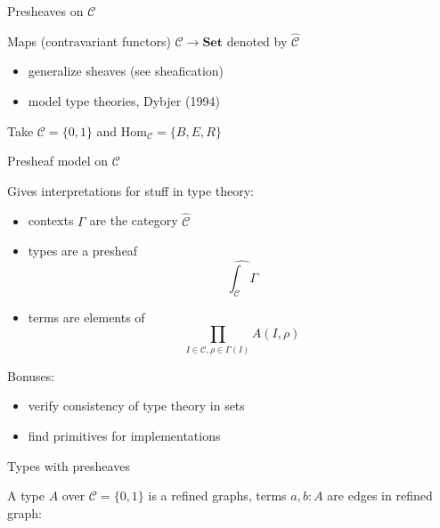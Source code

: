 \documentclass[english,draft]{beamer}
\begin{document}
\begin{frame}{Presheaves on $\mathcal{C}$}
 
 Maps (contravariant functors) $\mathcal{C} \rightarrow \mathbf{Set}$ denoted by $\hat{\mathcal{C}}$
 
 \begin{itemize}
 \item generalize sheaves (see sheafication)
 \item model type theories, Dybjer (1994)
 \end{itemize}
 
 \begin{example}    
 Take $\mathcal{C} = \{0,1\}$ and $\text{Hom}_{\mathcal{C}}= \{B,E,R\}$
 
     
 
 
 
\end{example} 

 
\end{frame}

\begin{frame}{Presheaf model on $\mathcal{C}$}
 
 Gives interpretations for stuff in type theory:
 \begin{itemize}
  \item contexts $\Gamma$ are the category $\widehat{\mathcal{C}}$
  \item types are a presheaf $$\widehat{\int_{\mathcal{C}} \Gamma}$$
  \item terms are elements of $$\prod _{I \in \mathcal{C}, \rho \in \Gamma (I)} A(I,\rho)$$
 \end{itemize}

 \pause
 
 Bonuses:
 
 \begin{itemize}
  \item verify consistency of type theory in sets
  \item find primitives for implementations
 \end{itemize}
 
\end{frame}

\begin{frame}{Types with presheaves}

  \begin{example}
  A type $A$  over $\mathcal{C} = \{0,1\}$ is a refined graphs,   
  terms $a,b:A$ are edges in refined graph:
  \begin{figure}\label{depgraphdiag}
\begin{center} 
  
\end{center}    
  \end{figure}
 \end{example}
\end{frame}
\end{document}
